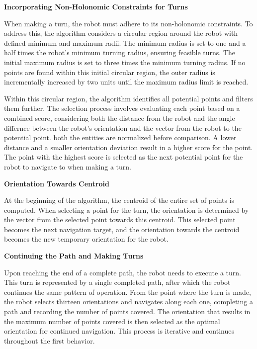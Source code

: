 \textbf{Incorporating Non-Holonomic Constraints for Turns}

When making a turn, the robot must adhere to its non-holonomic constraints. To address this, the algorithm considers a circular region around the robot with defined minimum and maximum radii. The minimum radius is set to one and a half times the robot's minimum turning radius, ensuring feasible turns. The initial maximum radius is set to three times the minimum turning radius. If no points are found within this initial circular region, the outer radius is incrementally increased by two units until the maximum radius limit is reached.
\vspace{6mm}  

Within this circular region, the algorithm identifies all potential points and filters them further. The selection process involves evaluating each point based on a combined score, considering both the distance from the robot and the angle differnce between the robot's orientation and the vector from the robot to the potential point. both the entities are normalized before comparison. A lower distance and a smaller orientation deviation result in a higher score for the point. The point with the highest score is selected as the next potential point for the robot to navigate to when making a turn.
\vspace*{6mm}  

\textbf{Orientation Towards Centroid}

At the beginning of the algorithm, the centroid of the entire set of points is computed. When selecting a point for the turn, the orientation is determined by the vector from the selected point towards this centroid. This selected point becomes the next navigation target, and the orientation towards the centroid becomes the new temporary orientation for the robot.

\vspace*{6mm}  

\textbf{Continuing the Path and Making Turns}

Upon reaching the end of a complete path, the robot needs to execute a turn. This turn is represented by a single completed path, after which the robot continues the same pattern of operation. From the point where the turn is made, the robot selects thirteen orientations and navigates along each one, completing a path and recording the number of points covered. The orientation that results in the maximum number of points covered is then selected as the optimal orientation for continued navigation. This process is iterative and continues throughout the first behavior.

